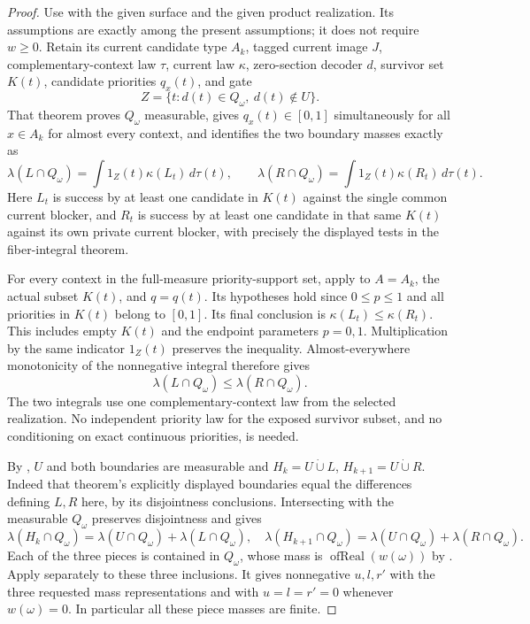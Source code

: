 \begin{proof}
Use  with
the given surface and the given product realization. Its assumptions are
exactly among the present assumptions; it does not require $w\ge0$.
Retain its current candidate type $A_k$, tagged current image $J$,
complementary-context law $\tau$, current law $\kappa$, zero-section
decoder $d$, survivor set $K(t)$, candidate priorities $q_x(t)$, and gate
\[
 Z=\{t:d(t)\in Q_\omega,\ d(t)\notin U\}.
\]
That theorem proves $Q_\omega$ measurable, gives $q_x(t)\in[0,1]$
simultaneously for all $x\in A_k$ for almost every context, and identifies
the two boundary masses exactly as
\[
 \lambda(L\cap Q_\omega)=\int 1_Z(t)\kappa(L_t)\,d\tau(t),\qquad
 \lambda(R\cap Q_\omega)=\int 1_Z(t)\kappa(R_t)\,d\tau(t).
\]
Here $L_t$ is success by at least one candidate in $K(t)$ against the
single common current blocker, and $R_t$ is success by at least one
candidate in that same $K(t)$ against its own private current blocker,
with precisely the displayed tests in the fiber-integral theorem.

For every context in the full-measure priority-support set, apply
 to $A=A_k$,
the actual subset $K(t)$, and $q=q(t)$. Its hypotheses hold since
$0\le p\le1$ and all priorities in $K(t)$ belong to $[0,1]$. Its final
conclusion is $\kappa(L_t)\le\kappa(R_t)$. This includes empty $K(t)$
and the endpoint parameters $p=0,1$. Multiplication by the same
indicator $1_Z(t)$ preserves the inequality. Almost-everywhere
monotonicity of the nonnegative integral therefore gives
\[
 \lambda(L\cap Q_\omega)\le\lambda(R\cap Q_\omega).
\]
The two integrals use one complementary-context law from the selected
realization. No independent priority law for the exposed survivor
subset, and no conditioning on exact continuous priorities, is needed.

By ,
$U$ and both boundaries are measurable and
$H_k=U\mathbin{\dot\cup}L$, $H_{k+1}=U\mathbin{\dot\cup}R$.
Indeed that theorem's explicitly displayed boundaries equal the
differences defining $L,R$ here, by its disjointness conclusions.
Intersecting with the measurable $Q_\omega$ preserves disjointness and
gives
\[
 \lambda(H_k\cap Q_\omega)=\lambda(U\cap Q_\omega)+\lambda(L\cap Q_\omega),
 \quad
 \lambda(H_{k+1}\cap Q_\omega)=\lambda(U\cap Q_\omega)+\lambda(R\cap Q_\omega).
\]
Each of the three pieces is contained in $Q_\omega$, whose mass is
$\operatorname{ofReal}(w(\omega))$ by
. Apply
 separately to these
three inclusions. It gives nonnegative $u,l,r'$ with the three requested
mass representations and with $u=l=r'=0$ whenever $w(\omega)=0$.
In particular all these piece masses are finite.


\end{proof}
